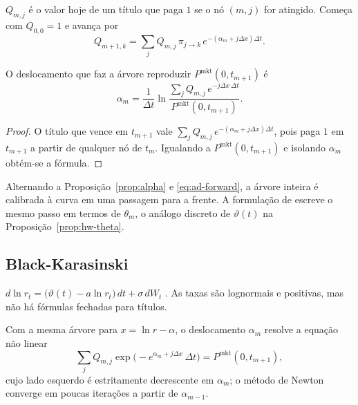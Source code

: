 \begin{definicao}
$Q_{m,j}$ é o valor hoje de um título que paga $1$ se o nó $(m,j)$ for atingido. Começa com $Q_{0,0}=1$ e avança por
\begin{equation}\label{eq:ad-forward}
Q_{m+1,k}=\sum_jQ_{m,j}\,\pi_{j\to k}\,e^{-(\alpha_m+j\Delta x)\Delta t}.
\end{equation}
\end{definicao}

\begin{proposicao}\label{prop:alpha}
O deslocamento que faz a árvore reproduzir $P^{\mathrm{mkt}}(0,t_{m+1})$ é
\begin{equation}
\alpha_m=\frac1{\Delta t}\ln\frac{\sum_jQ_{m,j}\,e^{-j\Delta x\,\Delta t}}{P^{\mathrm{mkt}}(0,t_{m+1})}.
\end{equation}
\end{proposicao}

\begin{proof}
O título que vence em $t_{m+1}$ vale $\sum_jQ_{m,j}\,e^{-(\alpha_m+j\Delta x)\Delta t}$, pois paga $1$ em $t_{m+1}$ a partir de qualquer nó de $t_m$. Igualando a $P^{\mathrm{mkt}}(0,t_{m+1})$ e isolando $\alpha_m$ obtém-se a fórmula.
\end{proof}

Alternando a Proposição~\ref{prop:alpha} e \eqref{eq:ad-forward}, a árvore inteira é calibrada à curva em uma passagem para a frente. A formulação de \citet{clewlowstrickland1998} escreve o mesmo passo em termos de $\theta_m$, o análogo discreto de $\vartheta(t)$ na Proposição~\ref{prop:hw-theta}.

\subsection{Black-Karasinski}

\begin{definicao}
$d\ln r_t=\big(\vartheta(t)-a\ln r_t\big)\,dt+\sigma\,dW_t$ \citep{blackkarasinski1991}. As taxas são lognormais e positivas, mas não há fórmulas fechadas para títulos.
\end{definicao}

\begin{proposicao}
Com a mesma árvore para $x=\ln r-\alpha$, o deslocamento $\alpha_m$ resolve a equação não linear
\begin{equation}
\sum_jQ_{m,j}\exp\big(-e^{\alpha_m+j\Delta x}\,\Delta t\big)=P^{\mathrm{mkt}}(0,t_{m+1}),
\end{equation}
cujo lado esquerdo é estritamente decrescente em $\alpha_m$; o método de Newton converge em poucas iterações a partir de $\alpha_{m-1}$.
\end{proposicao}

